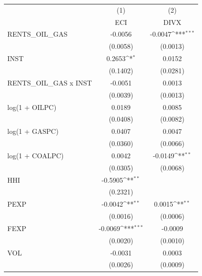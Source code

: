 {
\def\sym#1{\ifmmode^{#1}\else\(^{#1}\)\fi}
\begin{tabular}{l*{2}{c}}
\toprule
                    &\multicolumn{1}{c}{(1)}&\multicolumn{1}{c}{(2)}\\
                    &\multicolumn{1}{c}{ECI}&\multicolumn{1}{c}{DIVX}\\
\midrule
RENTS\_OIL\_GAS       &     -0.0056         &     -0.0047\sym{***}\\
                    &    (0.0058)         &    (0.0013)         \\
\addlinespace
INST                &      0.2653\sym{*}  &      0.0152         \\
                    &    (0.1402)         &    (0.0281)         \\
\addlinespace
RENTS\_OIL\_GAS x INST&     -0.0051         &      0.0013         \\
                    &    (0.0039)         &    (0.0013)         \\
\addlinespace
log(1 + OILPC)      &      0.0189         &      0.0085         \\
                    &    (0.0408)         &    (0.0082)         \\
\addlinespace
log(1 + GASPC)      &      0.0407         &      0.0047         \\
                    &    (0.0360)         &    (0.0066)         \\
\addlinespace
log(1 + COALPC)     &      0.0042         &     -0.0149\sym{**} \\
                    &    (0.0305)         &    (0.0068)         \\
\addlinespace
HHI                 &     -0.5905\sym{**} &                     \\
                    &    (0.2321)         &                     \\
\addlinespace
PEXP                &     -0.0042\sym{**} &      0.0015\sym{**} \\
                    &    (0.0016)         &    (0.0006)         \\
\addlinespace
FEXP                &     -0.0069\sym{***}&     -0.0009         \\
                    &    (0.0020)         &    (0.0010)         \\
\addlinespace
VOL                 &     -0.0031         &      0.0003         \\
                    &    (0.0026)         &    (0.0009)         \\

\end{tabular}}
